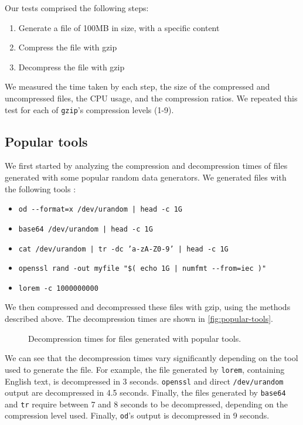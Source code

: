 \documentclass[a4paper,10pt,compsoc,conference]{IEEEtran}
\begin{document}
Our tests comprised the following steps:

\begin{enumerate}
\item Generate a file of 100MB in size, with a specific content
\item Compress the file with gzip
\item Decompress the file with gzip
\end{enumerate}

We measured the time taken by each step, the size of the compressed and
uncompressed files, the CPU usage, and the compression ratios. We repeated
this test for each of \texttt{gzip}'s compression levels (1-9). 

\subsection{Popular tools}
\label{sec:orged4bfa8}

We first started by analyzing the compression and decompression times of
files generated with some popular random data generators. We generated files
with the following tools \citep{strandbergLorem2022}:

\begin{itemize}
\item \texttt{od -{}-format=x /dev/urandom | head -c 1G}
\item \texttt{base64 /dev/urandom | head -c 1G}
\item \texttt{cat /dev/urandom | tr -dc 'a-zA-Z0-9' | head -c 1G}
\item \texttt{openssl rand -out myfile "\$( echo 1G | numfmt -{}-from=iec )"}
\item \texttt{lorem -c 1000000000}
\end{itemize}

We then compressed and decompressed these files with gzip, using the methods
described above. The decompression times are shown in \autoref{fig:popular-tools}.

\begin{figure}
  \begin{center}
    
  \end{center}
  \caption{Decompression times for files generated with popular tools.}
  \label{fig:popular-tools}
\end{figure}

We can see that the decompression times vary significantly
depending on the tool used to generate the file. For example, the file
generated by \texttt{lorem}, containing English text, is decompressed in 3 seconds.
\texttt{openssl} and direct \texttt{/dev/urandom} output are decompressed in 4.5 seconds.
Finally, the files generated by \texttt{base64} and \texttt{tr} require between 7 and 8
seconds to be decompressed, depending on the compression level used. Finally,
\texttt{od}'s output is decompressed in 9 seconds. 
\end{document}
